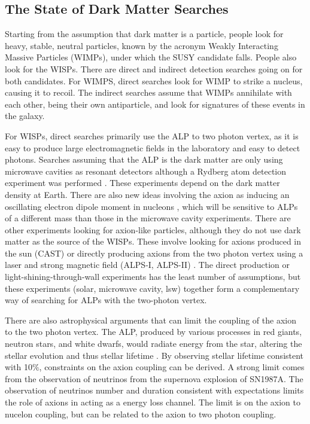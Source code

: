 \documentclass[12pt,twosides]{book}
\begin{document}
\subsection{The State of Dark Matter Searches}

Starting from the assumption that dark matter is a particle, people look for heavy, stable, neutral particles, known by the acronym Weakly Interacting Massive Particles (WIMPs), under which the SUSY candidate falls. People also look for the WISPs. There are direct and indirect detection searches going on for both candidates. For WIMPS, direct searches look for WIMP to strike a nucleus, causing it to recoil. The indirect searches assume that WIMPs annihilate with each other, being their own antiparticle, and look for signatures of these events in the galaxy.

For WISPs, direct searches primarily use the ALP to two photon vertex, as it is easy to produce large electromagnetic fields in the laboratory and easy to detect photons. Searches assuming that the ALP is the dark matter are only using microwave cavities as resonant detectors \cite{admx10} although a Rydberg atom detection experiment was performed \cite{yamamoto00}. These experiments depend on the dark matter density at Earth. There are also new ideas involving the axion as inducing an oscillating electron dipole moment in nucleons \cite{budker13}, which will be sensitive to  ALPs of a different mass than those in the microwave cavity experiments. There are other experiments looking for axion-like particles, although they do not use dark matter as the source of the WISPs. These involve looking for axions produced in the sun (CAST) \cite{cast11} or directly producing axions from the two photon vertex using a laser and strong magnetic field (ALPS-I, ALPS-II) \cite{ehret10}. The direct production or light-shining-through-wall experiments has the least number of assumptions, but these experiments (solar, microwave cavity, lsw) together form a complementary way of searching for ALPs with the two-photon vertex.

There are also astrophysical arguments that can limit the coupling of the axion to the two photon vertex. The ALP, produced by various processes in red giants, neutron stars, and white dwarfs, would radiate energy from the star, altering the stellar evolution and thus stellar lifetime \cite{turner89}. By observing stellar lifetime consistent with 10$\%$, constraints on the axion coupling can be derived\cite{raffelt95}. A strong limit comes from the observation of neutrinos from the supernova explosion of SN1987A. The observation of neutrinos number and duration consistent with expectations limits the role of axions in acting as a energy loss channel. The limit is on the axion to nucelon coupling, but can be related to the axion to two photon coupling.
\end{document}
